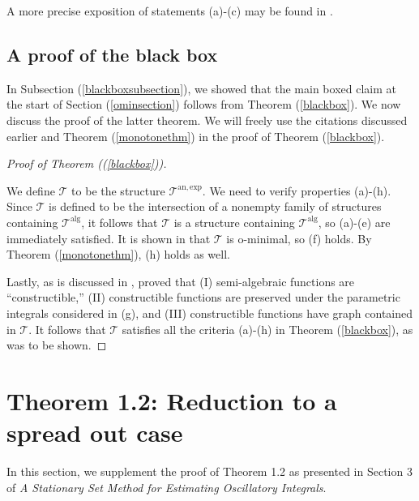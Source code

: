 \documentclass[12pt]{article}
\let\oldref\ref
\renewcommand{\ref}[1]{(\oldref{#1})}
\theoremstyle{definition}
\theoremstyle{remark}
\numberwithin{equation}{section}
\begin{document}
A more precise exposition of statements (a)-(c) may be found in \cite{vdDMM}.

\subsection{A proof of the black box}

In Subsection \ref{blackboxsubsection}, we showed that the main boxed claim at the start of Section \ref{ominsection} follows from Theorem \ref{blackbox}. We now discuss the proof of the latter theorem. We will freely use the citations discussed earlier and Theorem \ref{monotonethm} in the proof of Theorem \ref{blackbox}.

\begin{proof}[Proof of Theorem \ref{blackbox}]\label{blackboxproofsubsection}

We define $\mathcal{T}$ to be the structure $\mathcal{T}^{\mathrm{an},\mathrm{exp}}$. We need to verify properties (a)-(h). Since $\mathcal{T}$ is defined to be the intersection of a nonempty family of structures containing $\mathcal{T}^{\mathrm{alg}}$, it follows that $\mathcal{T}$ is a structure containing $\mathcal{T}^{\mathrm{alg}}$, so (a)-(e) are immediately satisfied. It is shown in \cite{vdDMM} that $\mathcal{T}$ is o-minimal, so (f) holds. By Theorem \ref{monotonethm}, (h) holds as well.

Lastly, as is discussed in \cite{BGZZ}, \cite{CM} proved that (I) semi-algebraic functions are ``constructible,'' (II) constructible functions are preserved under the parametric integrals considered in (g), and (III) constructible functions have graph contained in $\mathcal{T}$. It follows that $\mathcal{T}$ satisfies all the criteria (a)-(h) in Theorem \ref{blackbox}, as was to be shown.
    
\end{proof}

\section{Theorem 1.2: Reduction to a spread out case}

In this section, we supplement the proof of Theorem 1.2 as presented in Section 3 of \textit{A Stationary Set Method for Estimating Oscillatory Integrals}. %
\end{document}
